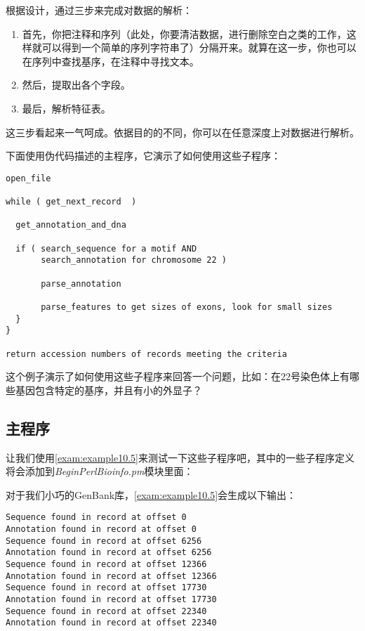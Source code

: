 根据设计，通过三步来完成对数据的解析：

\begin{enumerate}
  \item 首先，你把注释和序列（此处，你要清洁数据，进行删除空白之类的工作，这样就可以得到一个简单的序列字符串了）分隔开来。就算在这一步，你也可以在序列中查找基序，在注释中寻找文本。
  \item 然后，提取出各个字段。
  \item 最后，解析特征表。
\end{enumerate}

这三步看起来一气呵成。依据目的的不同，你可以在任意深度上对数据进行解析。

下面使用伪代码描述的主程序，它演示了如何使用这些子程序：

\begin{lstlisting}
open_file 

while ( get_next_record  )

  get_annotation_and_dna

  if ( search_sequence for a motif AND 
       search_annotation for chromosome 22 )

       parse_annotation

       parse_features to get sizes of exons, look for small sizes
  }
}

return accession numbers of records meeting the criteria
\end{lstlisting}

这个例子演示了如何使用这些子程序来回答一个问题，比如：在22号染色体上有哪些基因包含特定的基序，并且有小的外显子？
  
\subsection{主程序}
让我们使用\autoref{exam:example10.5}来测试一下这些子程序吧，其中的一些子程序定义将会添加到\textit{BeginPerlBioinfo.pm}模块里面：
  


对于我们小巧的GenBank库，\autoref{exam:example10.5}会生成以下输出：

\begin{lstlisting}
Sequence found in record at offset 0
Annotation found in record at offset 0
Sequence found in record at offset 6256
Annotation found in record at offset 6256
Sequence found in record at offset 12366
Annotation found in record at offset 12366
Sequence found in record at offset 17730
Annotation found in record at offset 17730
Sequence found in record at offset 22340
Annotation found in record at offset 22340
\end{lstlisting}

